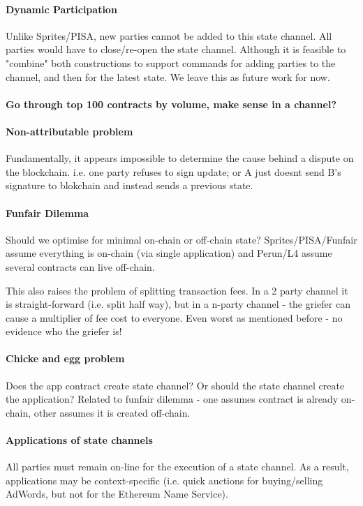 \documentclass{llncs}
\begin{document}
\paragraph{Dynamic Participation} Unlike Sprites/PISA, new parties cannot be added to this state channel. All parties would have to close/re-open the state channel. Although it is feasible to "combine" both constructions to support commands for adding parties to the channel, and then for the latest state. We leave this as future work for now. 

\paragraph{Go through top 100 contracts by volume, make sense in a channel?} 
\paragraph{Non-attributable problem} Fundamentally, it appears impossible to determine the cause behind a dispute on the blockchain. i.e. one party refuses to sign update; or A just doesnt send B's signature to blokchain and instead sends a previous state.

\paragraph{Funfair Dilemma} Should we optimise for minimal on-chain or off-chain state? Sprites/PISA/Funfair assume everything is on-chain (via single application) and Perun/L4 assume several contracts can live off-chain. 

This also raises the problem of splitting transaction fees. In a 2 party channel it is straight-forward (i.e. split half way), but in a n-party channel - the griefer can cause a multiplier of fee cost to everyone. Even worst as mentioned before - no evidence who the griefer is! 

\paragraph{Chicke and egg problem} Does the app contract create state channel? Or should the state channel create the application? Related to funfair dilemma - one assumes contract is already on-chain, other assumes it is created off-chain. 


\paragraph{Applications of state channels} All parties must remain on-line for the execution of a state channel. As a result, applications may be context-specific (i.e. quick auctions for buying/selling AdWords, but not for the Ethereum Name Service). 
\end{document}
